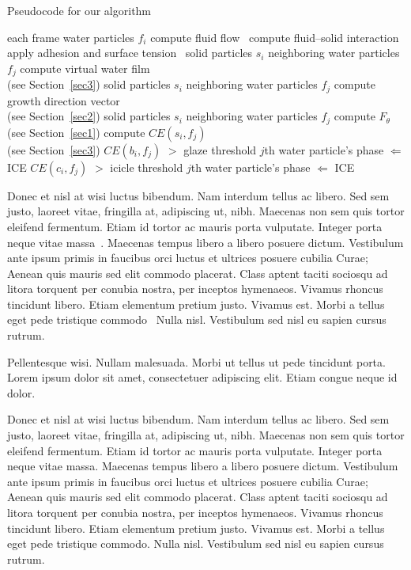 \documentclass[APA,LATO1COL]{WileyNJD-v2}
\begin{document}
\begin{algorithm}
\caption{Pseudocode for our algorithm}\label{alg1}
\begin{algorithmic}
  \For each frame
  \For water particles $f_{i}$
  \State compute fluid flow~\cite{Rothermel1997}
  \State compute fluid--solid interaction~\cite{Allen2011}
  \State apply adhesion and surface tension~\cite{Ballen2011}
  \EndFor
   \For solid particles $s_{i}$
   \For neighboring water particles $f_{j}$
   \State compute virtual water film \\(see Section~\ref{sec3})
   \EndFor
   \EndFor
   \For solid particles $s_{i}$
   \For neighboring water particles $f_{j}$
   \State compute growth direction vector \\(see Section~\ref{sec2})
   \EndFor
   \EndFor
   \For solid particles $s_{i}$
   \For neighboring water particles $f_{j}$
   \State compute $F_{\theta}$ (see Section~\ref{sec1})
   \State compute $CE(s_{i},f_{j})$ \\(see Section~\ref{sec3})
   \If $CE(b_{i}, f_{j})$ $>$ glaze threshold
   \State $j$th water particle's phase $\Leftarrow$ ICE
   \EndIf
   \If $CE(c_{i}, f_{j})$ $>$ icicle threshold
   \State $j$th water particle's phase $\Leftarrow$ ICE
   \EndIf
   \EndFor
   \EndFor
  \EndFor
\end{algorithmic}
\end{algorithm}

Donec et nisl at wisi luctus bibendum. Nam interdum tellus ac libero. Sed sem justo, laoreet vitae, fringilla at,
adipiscing ut, nibh. Maecenas non sem quis tortor eleifend fermentum. Etiam id tortor ac mauris porta vulputate.
Integer porta neque vitae massa~\cite{Rothermel1997,Elbaum2002}. Maecenas tempus libero a libero posuere dictum. Vestibulum ante ipsum primis in
faucibus orci luctus et ultrices posuere cubilia Curae; Aenean quis mauris sed elit commodo placerat. Class aptent
taciti sociosqu ad litora torquent per conubia nostra, per inceptos hymenaeos. Vivamus rhoncus tincidunt libero.
Etiam elementum pretium justo. Vivamus est. Morbi a tellus eget pede tristique commodo~\cite{Elbaum2002} Nulla nisl. Vestibulum
sed nisl eu sapien cursus rutrum.

Pellentesque wisi. Nullam malesuada. Morbi ut tellus ut pede tincidunt porta. Lorem ipsum dolor sit amet,
consectetuer adipiscing elit. Etiam congue neque id dolor.

Donec et nisl at wisi luctus bibendum. Nam interdum tellus ac libero. Sed sem justo, laoreet vitae, fringilla at,
adipiscing ut, nibh. Maecenas non sem quis tortor eleifend fermentum. Etiam id tortor ac mauris porta vulputate.
Integer porta neque vitae massa. Maecenas tempus libero a libero posuere dictum. Vestibulum ante ipsum primis in
faucibus orci luctus et ultrices posuere cubilia Curae; Aenean quis mauris sed elit commodo placerat. Class aptent
taciti sociosqu ad litora torquent per conubia nostra, per inceptos hymenaeos. Vivamus rhoncus tincidunt libero.
Etiam elementum pretium justo. Vivamus est. Morbi a tellus eget pede tristique commodo. Nulla nisl. Vestibulum
sed nisl eu sapien cursus rutrum.
\end{document}
